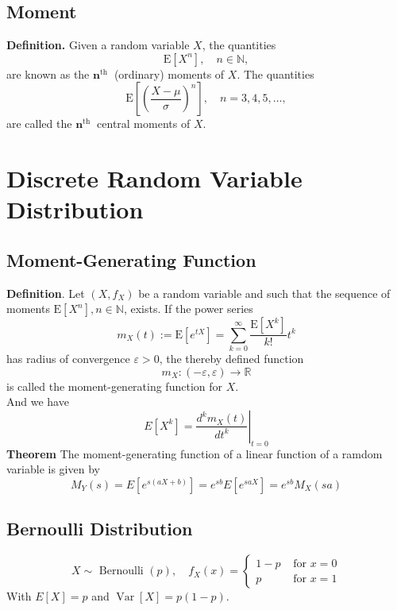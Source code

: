\documentclass[a4paper,12pt]{article}
\begin{document}
    \subsection{Moment}
    \textbf{Definition.} Given a random variable $X$, the quantities
    $$
    \mathrm{E}\left[X^n\right], \quad n \in \mathbb{N},
    $$
    are known as the $\boldsymbol{n}^{\text {th }}$ (ordinary) moments of $X$.
    The quantities
    $$
    \mathrm{E}\left[\left(\frac{X-\mu}{\sigma}\right)^n\right], \quad n=3,4,5, \ldots,
    $$
    are called the $\boldsymbol{n}^{\text {th }}$ central moments of $X$.






    \section{Discrete Random Variable Distribution}
    \subsection{Moment-Generating Function}
    \textbf{Definition}. Let $\left(X, f_X\right)$ be a random variable and such that the sequence of moments $\mathrm{E}\left[X^n\right], n \in \mathbb{N}$, exists.
If the power series
\begin{equation}
m_X(t):=\mathrm{E}\left[e^{t X}\right]=\sum_{k=0}^{\infty} \frac{\mathrm{E}\left[X^k\right]}{k !} t^k
\end{equation}
has radius of convergence $\varepsilon>0$, the thereby defined function
$$
m_X:(-\varepsilon, \varepsilon) \rightarrow \mathbb{R}
$$
is called the moment-generating function for $X$.\\
And we have
\begin{equation}
    E\left[X^k\right]=\left.\frac{d^k m_X(t)}{d t^k}\right|_{t=0}
    \end{equation}
\textbf{Theorem} The moment-generating function of a linear function of a ramdom variable is given by
\begin{equation}
    M_Y(s)=E\left[e^{s(a X+b)}\right]=e^{s b} E\left[e^{s a X}\right]=e^{s b} M_X(s a)
    \end{equation}

    \subsection{Bernoulli Distribution}
    $$
    X \sim \text { Bernoulli }(p), \quad f_X(x)= \begin{cases}1-p & \text { for } x=0 \\ p & \text { for } x=1\end{cases}
$$
    With $E[X]=p$ and $\operatorname{Var}[X]=p(1-p)$.
\end{document}
